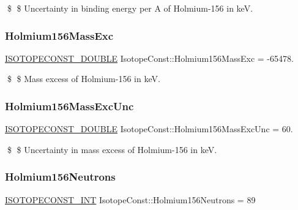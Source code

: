 \$ \$ Uncertainty in binding energy per A of Holmium-\/156 in keV. \mbox{\label{group___isotope_const-_holmium-_ho156_ga65f75147359de9b9c20bf4912d49dd03}} 
\subsubsection{\texorpdfstring{Holmium156\+Mass\+Exc}{Holmium156MassExc}}
{\footnotesize\ttfamily \mbox{\hyperlink{group___isotope_const-_macros_ga8f45a7272ce02c0b4c65c44636ed719a}{I\+S\+O\+T\+O\+P\+E\+C\+O\+N\+S\+T\+\_\+\+D\+O\+U\+B\+LE}} Isotope\+Const\+::\+Holmium156\+Mass\+Exc = -\/65478.}

\$ \$ Mass excess of Holmium-\/156 in keV. \mbox{\label{group___isotope_const-_holmium-_ho156_ga4df80ed958172970ec3fc504bd7b75a1}} 
\subsubsection{\texorpdfstring{Holmium156\+Mass\+Exc\+Unc}{Holmium156MassExcUnc}}
{\footnotesize\ttfamily \mbox{\hyperlink{group___isotope_const-_macros_ga8f45a7272ce02c0b4c65c44636ed719a}{I\+S\+O\+T\+O\+P\+E\+C\+O\+N\+S\+T\+\_\+\+D\+O\+U\+B\+LE}} Isotope\+Const\+::\+Holmium156\+Mass\+Exc\+Unc = 60.}

\$ \$ Uncertainty in mass excess of Holmium-\/156 in keV. \mbox{\label{group___isotope_const-_holmium-_ho156_ga7244b61d7ac2d6b085ddc937ec006704}} 
\subsubsection{\texorpdfstring{Holmium156\+Neutrons}{Holmium156Neutrons}}
{\footnotesize\ttfamily \mbox{\hyperlink{group___isotope_const-_macros_ga5f18360b3e99483a35c32d789e62621c}{I\+S\+O\+T\+O\+P\+E\+C\+O\+N\+S\+T\+\_\+\+I\+NT}} Isotope\+Const\+::\+Holmium156\+Neutrons = 89}

